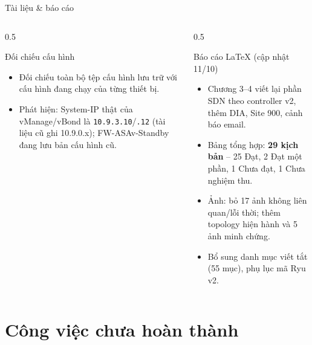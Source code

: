 \documentclass[aspectratio=169, 10pt]{beamer}
\begin{document}
\begin{frame}{Tài liệu \& báo cáo}
    \begin{columns}[T]
        \begin{column}{0.5\textwidth}
            \begin{block}{Đối chiếu cấu hình}
                \small
                \begin{itemize}
                    \item Đối chiếu toàn bộ tệp cấu hình lưu trữ với cấu hình đang chạy của từng thiết bị.
                    \item Phát hiện: System-IP thật của vManage/vBond là \texttt{10.9.3.10}/\texttt{.12}
                          (tài liệu cũ ghi 10.9.0.x); FW-ASAv-Standby đang lưu bản cấu hình cũ.
                \end{itemize}
            \end{block}
        \end{column}
        \begin{column}{0.5\textwidth}
            \begin{block}{Báo cáo LaTeX (cập nhật 11/10)}
                \small
                \begin{itemize}
                    \item Chương 3--4 viết lại phần SDN theo controller v2, thêm DIA, Site 900, cảnh báo email.
                    \item Bảng tổng hợp: \textbf{29 kịch bản} -- 25 Đạt, 2 Đạt một phần, 1 Chưa đạt, 1 Chưa nghiệm thu.
                    \item Ảnh: bỏ 17 ảnh không liên quan/lỗi thời; thêm topology hiện hành và 5 ảnh minh chứng.
                    \item Bổ sung danh mục viết tắt (55 mục), phụ lục mã Ryu v2.
                \end{itemize}
            \end{block}
        \end{column}
    \end{columns}
\end{frame}

\section{Công việc chưa hoàn thành}
\end{document}
